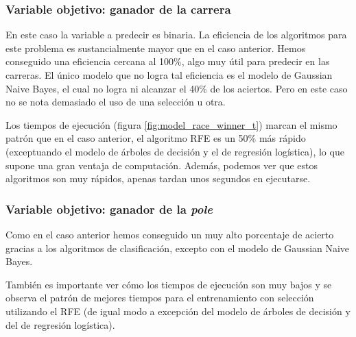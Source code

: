 \subsubsection{Variable objetivo: ganador de la carrera}
En este caso la variable a predecir es binaria. La eficiencia de los algoritmos para este problema es sustancialmente mayor que en el caso anterior. Hemos conseguido una eficiencia cercana al 100\%, algo muy útil para predecir en las carreras. El único modelo que no logra tal eficiencia es el modelo de Gaussian Naive Bayes, el cual no logra ni alcanzar el 40\% de los aciertos. Pero en este caso no se nota demasiado el uso de una selección u otra.

Los tiempos de ejecución (figura \ref{fig:model_race_winner_t}) marcan el mismo patrón que en el caso anterior, el algoritmo RFE es un 50\% más rápido (exceptuando el modelo de árboles de decisión y el de regresión logística), lo que supone una gran ventaja de computación. Además, podemos ver que estos algoritmos son muy rápidos, apenas tardan unos segundos en ejecutarse.


\subsubsection{Variable objetivo: ganador de la \textit{pole}}
Como en el caso anterior hemos conseguido un muy alto porcentaje de acierto gracias a los algoritmos de clasificación, excepto con el modelo de Gaussian Naive Bayes.

También es importante ver cómo los tiempos de ejecución son muy bajos y se observa el patrón de mejores tiempos para el entrenamiento con selección utilizando el RFE (de igual modo a excepción del modelo de árboles de decisión y del de regresión logística).
